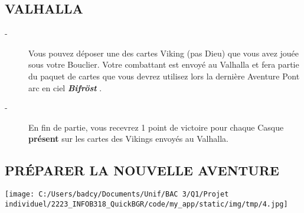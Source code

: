 \documentclass{scrartcl}%
\begin{document}
%
\subsection{ VALHALLA
}%
\label{subsec:VALHALLA}%
\begin{description}%
\item[{-} ]%
%
 Vous pouvez déposer une des cartes Viking (pas Dieu) que vous avez jouée sous votre Bouclier. Votre combattant est envoyé au Valhalla et fera partie du paquet de cartes que vous devrez utilisez lors la dernière Aventure Pont arc en ciel %
\textbf{\textit{Bifröst}}%
.
%
\item[{-} ]%
%
 En fin de partie, vous recevrez 1 point de victoire pour chaque Casque %
\textbf{présent}%
\textit{ }%
 sur les cartes des Vikings envoyés au Valhalla.
%
\end{description}

%
\subsection{ PRÉPARER LA NOUVELLE AVENTURE
}%
\label{subsec:PRPARERLANOUVELLEAVENTURE}%
%
\begin{center}\texttt{[image: C:/Users/badcy/Documents/Unif/BAC 3/Q1/Projet individuel/2223\_INFOB318\_QuickBGR/code/my\_app/static/img/tmp/4.jpg]}\end{center}%
\end{document}
